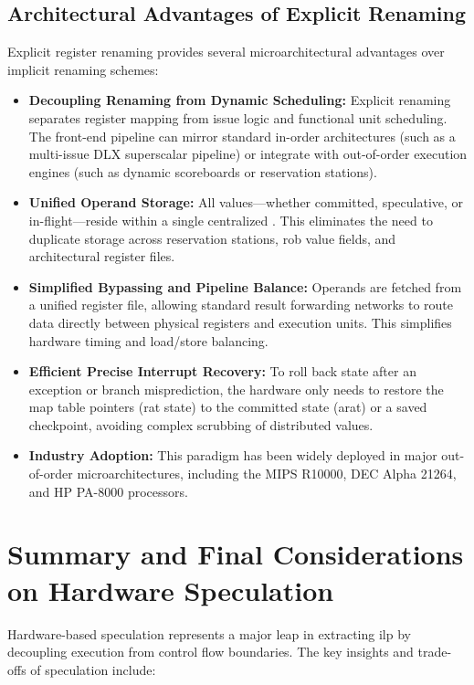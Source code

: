 \subsection{Architectural Advantages of Explicit Renaming}
Explicit register renaming provides several microarchitectural advantages over implicit renaming schemes:

\begin{itemize}
    \item \textbf{Decoupling Renaming from Dynamic Scheduling:} Explicit renaming separates register mapping from issue logic and functional unit scheduling. The front-end pipeline can mirror standard in-order architectures (such as a multi-issue \textsf{DLX} superscalar pipeline) or integrate with out-of-order execution engines (such as dynamic scoreboards or reservation stations).
    \item \textbf{Unified Operand Storage:} All values—whether committed, speculative, or in-flight—reside within a single centralized . This eliminates the need to duplicate storage across reservation stations, \gls{rob} value fields, and architectural register files.
    \item \textbf{Simplified Bypassing and Pipeline Balance:} Operands are fetched from a unified register file, allowing standard result forwarding networks to route data directly between physical registers and execution units. This simplifies hardware timing and load/store balancing.
    \item \textbf{Efficient Precise Interrupt Recovery:} To roll back state after an exception or branch misprediction, the hardware only needs to restore the map table pointers (\gls{rat} state) to the committed state (\gls{arat}) or a saved checkpoint, avoiding complex scrubbing of distributed values.
    \item \textbf{Industry Adoption:} This paradigm has been widely deployed in major out-of-order microarchitectures, including the MIPS R10000, DEC Alpha 21264, and HP PA-8000 processors.
\end{itemize}

\section{Summary and Final Considerations on Hardware Speculation}
\label{sec:hw_speculation_summary}

Hardware-based speculation represents a major leap in extracting \gls{ilp} by decoupling execution from control flow boundaries. The key insights and trade-offs of speculation include:

